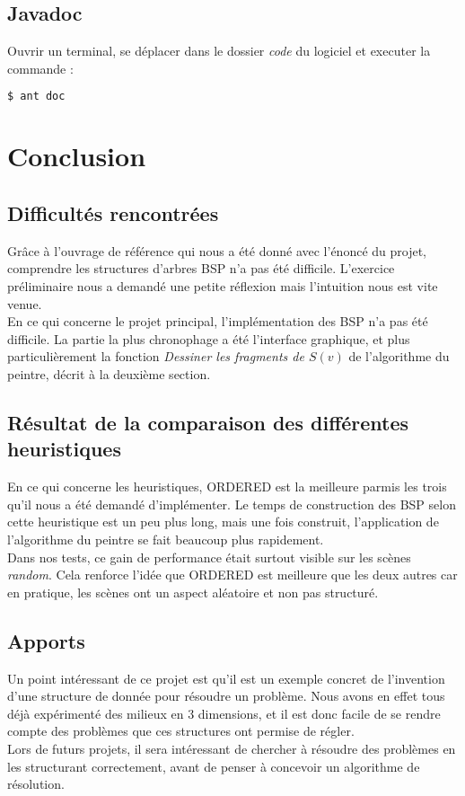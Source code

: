 \documentclass[11pts]{article}
\begin{document}
\subsection*{Javadoc}
Ouvrir un terminal, se déplacer dans le dossier \emph{code} du logiciel et executer la commande :
\begin{lstlisting}[language=bash]
$ ant doc
\end{lstlisting}


\newpage
\section{Conclusion}
\subsection*{Difficultés rencontrées}
Grâce à l'ouvrage de référence qui nous a été donné avec l'énoncé du projet, comprendre les structures d'arbres BSP n'a pas été difficile. L'exercice préliminaire nous a demandé une petite réflexion mais l'intuition nous est vite venue.\\
En ce qui concerne le projet principal, l'implémentation des BSP n'a pas été difficile. La partie la plus chronophage a été l'interface graphique, et plus particulièrement la fonction \emph{Dessiner les fragments de $S(v)$} de l'algorithme du peintre, décrit à la deuxième section.
\subsection*{Résultat de la comparaison des différentes heuristiques}
En ce qui concerne les heuristiques, ORDERED est la meilleure parmis les trois qu'il nous a été demandé d'implémenter. Le temps de construction des BSP selon cette heuristique est un peu plus long, mais une fois construit, l'application de l'algorithme du peintre se fait beaucoup plus rapidement.\\
Dans nos tests, ce gain de performance était surtout visible sur les scènes \emph{random}. Cela renforce l'idée que ORDERED est meilleure que les deux autres car en pratique, les scènes ont un aspect aléatoire et non pas structuré.
\subsection*{Apports}
Un point intéressant de ce projet est qu'il est un exemple concret de l'invention d'une structure de donnée pour résoudre un problème. Nous avons en effet tous déjà expérimenté des milieux en 3 dimensions, 
et il est donc facile de se rendre compte des problèmes que ces structures ont permise de régler.\\
Lors de futurs projets, il sera intéressant de chercher à résoudre des problèmes en les structurant correctement, avant de penser à concevoir un algorithme de résolution.
\end{document}
